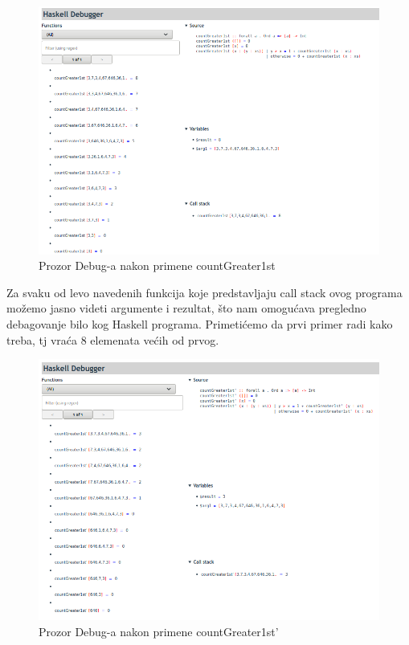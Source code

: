 \documentclass[a4paper]{article}
\begin{document}
{{\begin{figure}[h!]
\begin{center}
\includegraphics[scale=0.4]{mitchell-browser-pregled.png}
\caption{Prozor Debug-a nakon primene countGreater1st}
\end{center}
\end{figure}

Za svaku od levo navedenih funkcija koje predstavljaju call stack ovog programa možemo jasno videti argumente i rezultat, što nam omogućava pregledno debagovanje bilo kog Haskell programa.
Primetićemo da prvi primer radi kako treba, tj vraća 8 elemenata većih od prvog.
\begin{figure}[h!]
\begin{center}
\includegraphics[scale=0.3]{mitchell-browser-pregled'.png}
\caption{Prozor Debug-a nakon primene countGreater1st'}
\end{center}
\end{figure}

}}
\end{document}
